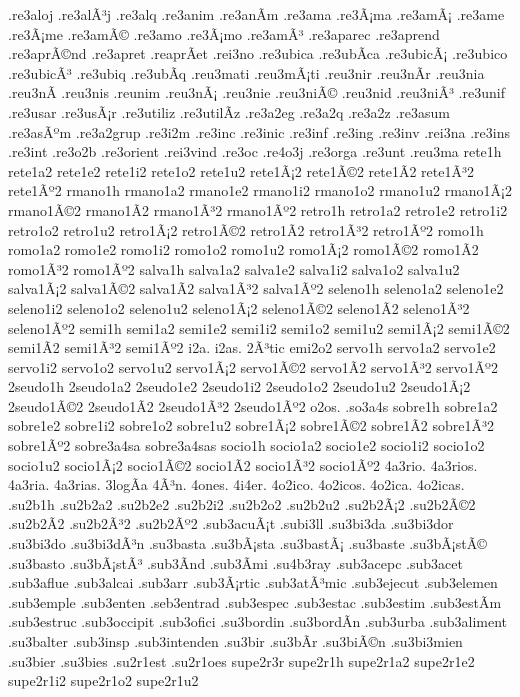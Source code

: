 {.re3aloj
.re3alÃ³j
.re3alq
.re3anim
.re3anÃ­m
.re3ama
.re3Ã¡ma
.re3amÃ¡
.re3ame
.re3Ã¡me
.re3amÃ©
.re3amo
.re3Ã¡mo
.re3amÃ³
.re3aparec
.re3aprend
.re3aprÃ©nd
.re3apret
.reaprÃ­et
.rei3no
.re3ubica
.re3ubÃ­ca
.re3ubicÃ¡
.re3ubico
.re3ubicÃ³
.re3ubiq
.re3ubÃ­q
.reu3mati
.reu3mÃ¡ti
.reu3nir
.reu3nÃ­r
.reu3nia
.reu3nÃ­
.reu3nis
.reunim
.reu3nÃ¡
.reu3nie
.reu3niÃ©
.reu3nid
.reu3niÃ³
.re3unif
.re3usar
.re3usÃ¡r
.re3utiliz
.re3utilÃ­z
.re3a2eg
.re3a2q
.re3a2z
.re3asum
.re3asÃºm
.re3a2grup
.re3i2m
.re3inc
.re3inic
.re3inf
.re3ing
.re3inv
.rei3na
.re3ins
.re3int
.re3o2b
.re3orient
.rei3vind
.re3oc
.re4o3j
.re3orga
.re3unt
.reu3ma
rete1h
rete1a2 rete1e2 rete1i2 rete1o2 rete1u2
rete1Ã¡2 rete1Ã©2 rete1Ã­2 rete1Ã³2 rete1Ãº2
rmano1h
rmano1a2 rmano1e2 rmano1i2 rmano1o2 rmano1u2
rmano1Ã¡2 rmano1Ã©2 rmano1Ã­2 rmano1Ã³2 rmano1Ãº2
retro1h
retro1a2 retro1e2 retro1i2 retro1o2 retro1u2
retro1Ã¡2 retro1Ã©2 retro1Ã­2 retro1Ã³2 retro1Ãº2
romo1h
romo1a2 romo1e2 romo1i2 romo1o2 romo1u2
romo1Ã¡2 romo1Ã©2 romo1Ã­2 romo1Ã³2 romo1Ãº2
salva1h
salva1a2 salva1e2 salva1i2 salva1o2 salva1u2
salva1Ã¡2 salva1Ã©2 salva1Ã­2 salva1Ã³2 salva1Ãº2
seleno1h
seleno1a2 seleno1e2 seleno1i2 seleno1o2 seleno1u2
seleno1Ã¡2 seleno1Ã©2 seleno1Ã­2 seleno1Ã³2 seleno1Ãº2
semi1h
semi1a2 semi1e2 semi1i2 semi1o2 semi1u2
semi1Ã¡2 semi1Ã©2 semi1Ã­2 semi1Ã³2 semi1Ãº2
i2a.
i2as.
2Ã³tic
emi2o2
servo1h
servo1a2 servo1e2 servo1i2 servo1o2 servo1u2
servo1Ã¡2 servo1Ã©2 servo1Ã­2 servo1Ã³2 servo1Ãº2
2seudo1h
2seudo1a2 2seudo1e2 2seudo1i2 2seudo1o2 2seudo1u2
2seudo1Ã¡2 2seudo1Ã©2 2seudo1Ã­2 2seudo1Ã³2 2seudo1Ãº2
o2os.
.so3a4s
sobre1h
sobre1a2 sobre1e2 sobre1i2 sobre1o2 sobre1u2
sobre1Ã¡2 sobre1Ã©2 sobre1Ã­2 sobre1Ã³2 sobre1Ãº2
sobre3a4sa
sobre3a4sas
socio1h
socio1a2 socio1e2 socio1i2 socio1o2 socio1u2
socio1Ã¡2 socio1Ã©2 socio1Ã­2 socio1Ã³2 socio1Ãº2
4a3rio.
4a3rios.
4a3ria.
4a3rias.
3logÃ­a
4Ã³n.
4ones.
4i4er.
4o2ico.
4o2icos.
4o2ica.
4o2icas.
.su2b1h
.su2b2a2 .su2b2e2 .su2b2i2 .su2b2o2 .su2b2u2
.su2b2Ã¡2 .su2b2Ã©2 .su2b2Ã­2 .su2b2Ã³2 .su2b2Ãº2
.sub3acuÃ¡t
.subi3ll
.su3bi3da
.su3bi3dor
.su3bi3do
.su3bi3dÃ³n
.su3basta
.su3bÃ¡sta
.su3bastÃ¡
.su3baste
.su3bÃ¡stÃ©
.su3basto
.su3bÃ¡stÃ³
.sub3Ã­nd
.sub3Ã­mi
.su4b3ray
.sub3acepc
.sub3acet
.sub3aflue
.sub3alcai
.sub3arr
.sub3Ã¡rtic
.sub3atÃ³mic
.sub3ejecut
.sub3elemen
.sub3emple
.sub3enten
.seb3entrad
.sub3espec
.sub3estac
.sub3estim
.sub3estÃ­m
.sub3estruc
.sub3occipit
.sub3ofici
.su3bordin
.su3bordÃ­n
.sub3urba
.sub3aliment
.su3balter
.sub3insp
.sub3intenden
.su3bir
.su3bÃ­r
.su3biÃ©n
.su3bi3mien
.su3bier
.su3bies
.su2r1est
.su2r1oes
supe2r3r
supe2r1h
supe2r1a2 supe2r1e2 supe2r1i2 supe2r1o2 supe2r1u2
}
